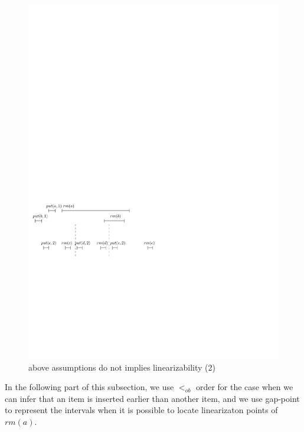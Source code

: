 \begin{figure}[htbp]
  \centering
  \includegraphics[width=0.6 \textwidth]{PIC-HIS-INTRO-OB-ORDER2.pdf}
  \caption{above assumptions do not implies linearizability (2)}
  \label{fig:history introduct ob order2}
\end{figure}

In the following part of this subsection, we use $<_{\textit{ob}}$ order for the case when we can infer that an item is inserted earlier than another item, and we use gap-point to represent the intervals when it is possible to locate linearizaton points of $\textit{rm}(a)$.


